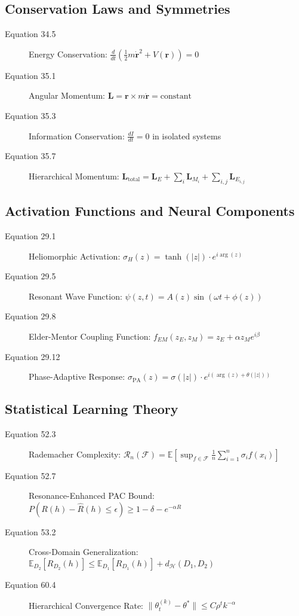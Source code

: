 \subsection{Conservation Laws and Symmetries}

\begin{description}
\item[Equation 34.5] Energy Conservation: $\frac{d}{dt}\left(\frac{1}{2}m\dot{\mathbf{r}}^2 + V(\mathbf{r})\right) = 0$
\item[Equation 35.1] Angular Momentum: $\mathbf{L} = \mathbf{r} \times m\dot{\mathbf{r}} = \text{constant}$
\item[Equation 35.3] Information Conservation: $\frac{dI}{dt} = 0$ in isolated systems
\item[Equation 35.7] Hierarchical Momentum: $\mathbf{L}_{\text{total}} = \mathbf{L}_E + \sum_i \mathbf{L}_{M_i} + \sum_{i,j} \mathbf{L}_{E_{i,j}}$
\end{description}

\subsection{Activation Functions and Neural Components}

\begin{description}
\item[Equation 29.1] Heliomorphic Activation: $\sigma_H(z) = \tanh(|z|) \cdot e^{i\arg(z)}$
\item[Equation 29.5] Resonant Wave Function: $\psi(z,t) = A(z) \sin(\omega t + \phi(z))$
\item[Equation 29.8] Elder-Mentor Coupling Function: $f_{EM}(z_E, z_M) = z_E + \alpha z_M e^{i\beta}$
\item[Equation 29.12] Phase-Adaptive Response: $\sigma_{\text{PA}}(z) = \sigma(|z|) \cdot e^{i(\arg(z) + \theta(|z|))}$
\end{description}

\subsection{Statistical Learning Theory}

\begin{description}
\item[Equation 52.3] Rademacher Complexity: $\mathcal{R}_n(\mathcal{F}) = \mathbb{E}\left[\sup_{f \in \mathcal{F}} \frac{1}{n}\sum_{i=1}^n \sigma_i f(x_i)\right]$
\item[Equation 52.7] Resonance-Enhanced PAC Bound: $P(R(h) - \hat{R}(h) \leq \epsilon) \geq 1 - \delta - e^{-\alpha R}$
\item[Equation 53.2] Cross-Domain Generalization: $\mathbb{E}_{D_2}[R_{D_2}(h)] \leq \mathbb{E}_{D_1}[R_{D_1}(h)] + d_{\mathcal{H}}(D_1, D_2)$
\item[Equation 60.4] Hierarchical Convergence Rate: $\|\theta_t^{(k)} - \theta^*\| \leq C \rho^t k^{-\alpha}$
\end{description}


